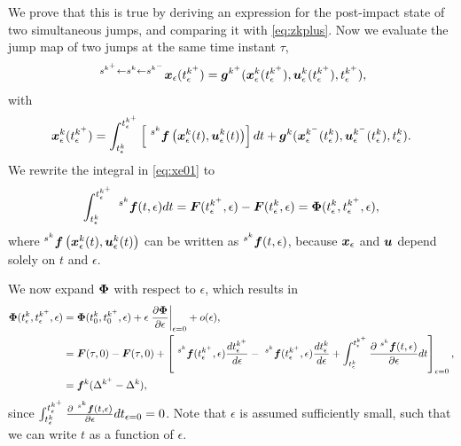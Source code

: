 \documentclass[DC2017114Bouma.tex]{subfiles}
\begin{document}
We prove that this is true by deriving an expression for the post-impact state of two simultaneous jumps, and comparing it with \eqref{eq:zkplus}. Now we evaluate the jump map of two jumps at the same time instant $\tau$,
\begin{align}
\ ^{s^{k^+}\leftarrow s^{k}\leftarrow s^{k^-}}{\boldsymbol{x}}_\epsilon(t_\epsilon^{k^+}) = {\boldsymbol{g}}^{k^+}({\boldsymbol{x}}^{k}_\epsilon(t_\epsilon^{k^+}),{\boldsymbol{u}}^{k}_\epsilon(t_\epsilon^{k^+}),t_\epsilon^{k^+}),\label{eq:xe012}
\end{align}
with
\begin{align}
\xb^{k}_\epsilon(t_\epsilon^{k^+}) = \int_{t_\epsilon^{k}}^{t_\epsilon^{k^+}}\left[\ ^{s^{k}}\fb\left(\xb^{k}_\epsilon(t),\ub^{k}_\epsilon(t)\right)\right]dt + \gb^{k}(\xb^{k^-}_\epsilon(t_\epsilon^{k}),\ub^{k^-}_\epsilon(t_\epsilon^{k}),t_\epsilon^{k}).\label{eq:xe01}
\end{align}
We rewrite the integral in \eqref{eq:xe01} to
\begin{align}
\int_{t_\epsilon^{k}}^{t_\epsilon^{k^+}}\ ^{s^{k}}{\boldsymbol{f}}(t,\epsilon)dt = {\boldsymbol{F}}(t_\epsilon^{k^+},\epsilon) - {\boldsymbol{F}}(t_\epsilon^{k},\epsilon) = \boldsymbol{\Phi}(t_\epsilon^{k},t_\epsilon^{k^+},\epsilon),
\end{align}
where $^{s^{k}}{\boldsymbol{f}}\left({\boldsymbol{x}}^{k}_\epsilon(t),{\boldsymbol{u}}^{k}_\epsilon(t)\right)$ can be written as $^{s^{k}}{\boldsymbol{f}}(t,\epsilon)$, because ${\boldsymbol{x}}_\epsilon$ and ${\boldsymbol{u}}$ depend solely on $t$ and $\epsilon$.

We now expand $\boldsymbol{\Phi}$ with respect to $\epsilon$, which results in
\begin{align}
\Phib(t_\epsilon^{k},t_\epsilon^{k^+},\epsilon) &= \Phib(t_0^{k},t_0^{k^+},\epsilon) + \epsilon\left.\frac{\partial\Phib}{\partial\epsilon}\right|_{\epsilon = 0} + o(\epsilon),\\
&= \Fb(\tau,0) - \Fb(\tau,0) + \left[\ ^{s^{k}}\fb(t^{k^+}_\epsilon,\epsilon)\frac{dt^{k^+}_\epsilon}{d\epsilon} - \ ^{s^{k}}\fb(t^{k^+}_\epsilon,\epsilon)\frac{dt^{k}_\epsilon}{d\epsilon} + \int_{t^{k}_\epsilon}^{t^{k^+}_\epsilon}\frac{\partial\ ^{s^{k}}\fb(t,\epsilon)}{\partial\epsilon}dt\right]_{\epsilon=0},\\
&= \fb^{k}(\Delta^{k^+}-\Delta^{k}), 
\end{align}
since $\int_{t^{k}_\epsilon}^{t^{k^+}_\epsilon}\frac{\partial\ ^{s^{k}}\fb(t,\epsilon)}{\partial\epsilon}dt_{\epsilon = 0} = 0$.
Note that $\epsilon$ is assumed sufficiently small, such that we can write $t$ as a function of $\epsilon$.
\end{document}

